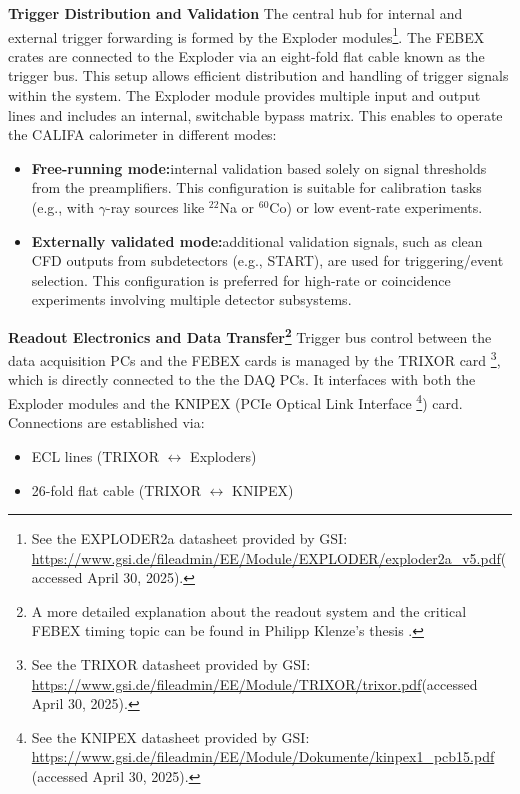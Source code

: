 \textbf{Trigger Distribution and Validation}\newline
The central hub for internal and external trigger forwarding is formed by the Exploder modules\footnote{See the EXPLODER2a datasheet provided by GSI: \url{https://www.gsi.de/fileadmin/EE/Module/EXPLODER/exploder2a\_v5.pdf}(accessed April 30, 2025).}. The FEBEX crates are connected to the Exploder via an eight-fold flat cable known as the trigger bus. This setup allows efficient distribution and handling of trigger signals within the system.\newline
The Exploder module provides multiple input and output lines and includes an internal, switchable bypass matrix. This enables to operate the CALIFA calorimeter in different modes:
\begin{itemize}
\item \textbf{Free-running mode:}internal validation based solely on signal thresholds from the preamplifiers. This configuration is suitable for calibration tasks (e.g., with $\gamma$-ray sources like $^{22}$Na or $^{60}$Co) or low event-rate experiments.
\item \textbf{Externally validated mode:}additional validation signals, such as clean CFD outputs from subdetectors (e.g., START), are used for triggering/event selection. This configuration is preferred for high-rate or coincidence experiments involving multiple detector subsystems.
\end{itemize}
\textbf{Readout Electronics and Data Transfer\footnote{A more detailed explanation about the readout system and the critical FEBEX timing topic can be found in Philipp Klenze's thesis \cite{pklenze}.}}\newline
Trigger bus control between the data acquisition PCs and the FEBEX cards is managed by the TRIXOR card \footnote{See the TRIXOR datasheet provided by GSI: \url{https://www.gsi.de/fileadmin/EE/Module/TRIXOR/trixor.pdf}(accessed April 30, 2025).}, which is directly connected to the the DAQ PCs. It interfaces with both the Exploder modules and the KNIPEX (PCIe Optical Link Interface \footnote{See the KNIPEX datasheet provided by GSI: \url{https://www.gsi.de/fileadmin/EE/Module/Dokumente/kinpex1\_pcb15.pdf} (accessed April 30, 2025).}) card. Connections are established via:
\begin{itemize}
\item ECL lines (TRIXOR $\leftrightarrow$ Exploders)
\item 26-fold flat cable (TRIXOR $\leftrightarrow$ KNIPEX)
\end{itemize}
